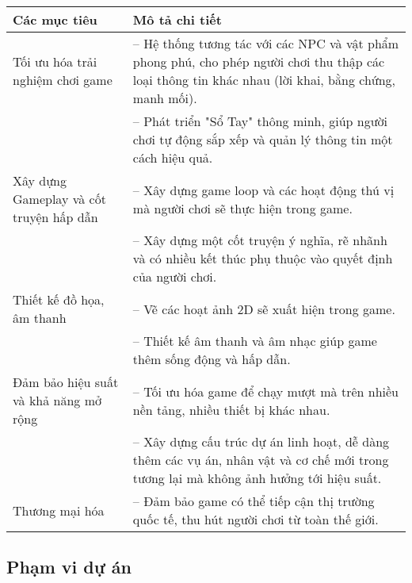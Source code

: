 \begin{table}[H]
    \centering
    \begin{tabular}{|p{5cm}|p{9.5cm}|}
    \hline
    \centering \textbf{Các mục tiêu} 
    & \textbf{Mô tả chi tiết} \\
    \hline
    \centering Tối ưu hóa trải nghiệm chơi game  
    & -- Hệ thống tương tác với các NPC và vật phẩm phong phú, cho phép người chơi thu thập các loại thông tin khác nhau (lời khai, bằng chứng, manh mối).  \\
    & -- Phát triển "Sổ Tay" thông minh, giúp người chơi tự động sắp xếp và quản lý thông tin một cách hiệu quả. \\
    \hline
    \centering Xây dựng Gameplay và cốt truyện hấp dẫn
    & -- Xây dựng game loop và các hoạt động thú vị mà người chơi sẽ thực hiện trong game. \\
    & -- Xây dựng một cốt truyện ý nghĩa, rẽ nhãnh và có nhiều kết thúc phụ thuộc vào quyết định của người chơi. \\
    \hline
    \centering Thiết kế đồ họa, âm thanh
    & -- Vẽ các hoạt ảnh 2D sẽ xuất hiện trong game. \\
    & -- Thiết kế âm thanh và âm nhạc giúp game thêm sống động và hấp dẫn. \\
    \hline
    \centering Đảm bảo hiệu suất và khả năng mở rộng
    & -- Tối ưu hóa game để chạy mượt mà trên nhiều nền tảng, nhiều thiết bị khác nhau. \\
    & -- Xây dựng cấu trúc dự án linh hoạt, dễ dàng thêm các vụ án, nhân vật và cơ chế mới trong tương lại mà không ảnh hưởng tới hiệu suất. \\
    \hline
    \centering Thương mại hóa
    & -- Đảm bảo game có thể tiếp cận thị trường quốc tế, thu hút người chơi từ toàn thế giới. \\
    \hline
    \end{tabular}
\end{table}

\subsection{Phạm vi dự án}
